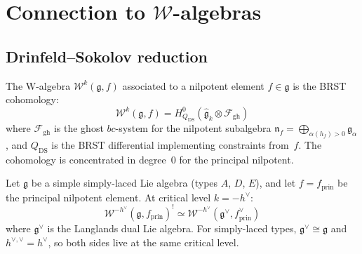 \section{Connection to $\mathcal{W}$-algebras}

\subsection{Drinfeld--Sokolov reduction}

\begin{definition}
The W-algebra $\mathcal{W}^k(\mathfrak{g}, f)$ associated to a nilpotent element $f \in \mathfrak{g}$ is the BRST cohomology:
\begin{equation}
\mathcal{W}^k(\mathfrak{g}, f) = H^0_{Q_{\mathrm{DS}}}(\widehat{\mathfrak{g}}_k \otimes \mathcal{F}_{\mathrm{gh}})
\end{equation}
where $\mathcal{F}_{\mathrm{gh}}$ is the ghost $bc$-system for the nilpotent subalgebra $\mathfrak{n}_f = \bigoplus_{\alpha(h_f)>0} \mathfrak{g}_\alpha$, and $Q_{\mathrm{DS}}$ is the BRST differential implementing constraints from~$f$.  The cohomology is concentrated in degree~$0$ for the principal nilpotent.
\end{definition}

\begin{theorem}\label{thm:w-algebra-koszul}
Let $\mathfrak{g}$ be a simple simply-laced Lie algebra (types $A$, $D$, $E$), and let $f = f_{\mathrm{prin}}$ be the principal nilpotent element.  At critical level $k = -h^\vee$:
\begin{equation}
\mathcal{W}^{-h^\vee}(\mathfrak{g}, f_{\mathrm{prin}})^! \simeq \mathcal{W}^{-h^\vee}(\mathfrak{g}^\vee, f^\vee_{\mathrm{prin}})
\end{equation}
where $\mathfrak{g}^\vee$ is the Langlands dual Lie algebra.  For simply-laced types, $\mathfrak{g}^\vee \cong \mathfrak{g}$ and $h^{\vee,\vee} = h^\vee$, so both sides live at the same critical level.
\end{theorem}


